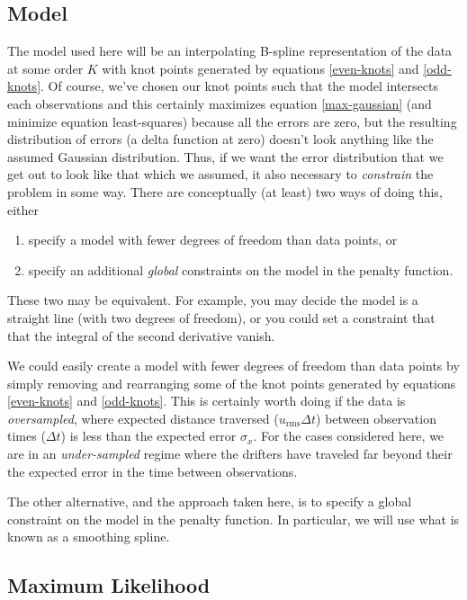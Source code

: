 \documentclass[twocol]{ametsoc}
\begin{document}
\subsection{Model}

The model used here will be an interpolating B-spline representation of the data at some order $K$ with knot points generated by equations \ref{even-knots} and \ref{odd-knots}. Of course, we've chosen our knot points such that the model intersects each observations and this certainly maximizes equation \ref{max-gaussian} (and minimize equation least-squares) because all the errors are zero, but the resulting distribution of errors (a delta function at zero) doesn't look anything like the assumed Gaussian distribution. Thus, if we want the error distribution that we get out to look like that which we assumed, it also necessary to \emph{constrain} the problem in some way. There are conceptually (at least) two ways of doing this, either 
\begin{enumerate}
\item specify a model with fewer degrees of freedom than data points, or
\item specify an additional \emph{global} constraints on the model in the penalty function.
\end{enumerate}
These two may be equivalent. For example, you may decide the model is a straight line (with two degrees of freedom), or you could set a constraint that that the integral of the second derivative vanish.

We could easily create a model with fewer degrees of freedom than data points by simply removing and rearranging  some of the knot points generated by equations \ref{even-knots} and \ref{odd-knots}. This is certainly worth doing if the data is \emph{oversampled}, where expected distance traversed ($u_{\textrm{rms}}\Delta t$) between observation times ($\Delta t$) is less than the expected error $\sigma_x$. For the cases considered here, we are in an \emph{under-sampled} regime where the drifters have traveled far beyond their the expected error in the time between observations.

The other alternative, and the approach taken here, is to specify a global constraint on the model in the penalty function. In particular, we will use what is known as a smoothing spline.

\subsection{Maximum Likelihood}
\end{document}
